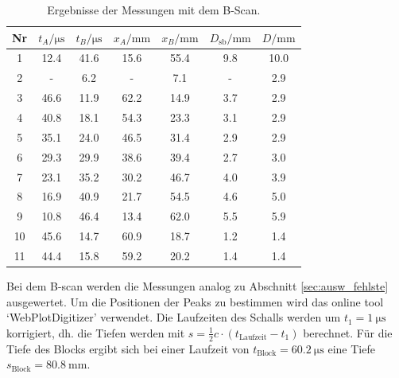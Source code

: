 \begin{table}[h]
    \centering
    \begin{tabular}{S[table-format=:.0] S S S S S S}
        \toprule
        {Nr}& {$t_A/\unit{\micro\second}$} & {$t_B/\unit{\micro\second}$} &
        {$x_A/\unit{\mm}$} & {$x_B/\unit{\mm}$} & {$D_\text{sb}/\unit{\mm}$}& {$D/\unit{\mm}$}\\
               & 12.4  & 41.6  & 15.6  & 55.4  & 9.8  & 10.0 \\
        2       & {-}   & 6.2   & {-}   & 7.1   & {-}  & 2.9  \\
        3       & 46.6  & 11.9  & 62.2  & 14.9  & 3.7  & 2.9  \\
        4       & 40.8  & 18.1  & 54.3  & 23.3  & 3.1  & 2.9  \\
        5       & 35.1  & 24.0  & 46.5  & 31.4  & 2.9  & 2.9  \\
        6       & 29.3  & 29.9  & 38.6  & 39.4  & 2.7  & 3.0  \\
        7       & 23.1  & 35.2  & 30.2  & 46.7  & 4.0  & 3.9  \\
        8       & 16.9  & 40.9  & 21.7  & 54.5  & 4.6  & 5.0  \\
        9       & 10.8  & 46.4  & 13.4  & 62.0  & 5.5  & 5.9  \\
        10      & 45.6  & 14.7  & 60.9  & 18.7  & 1.2  & 1.4  \\
        11      & 44.4  & 15.8  & 59.2  & 20.2  & 1.4  & 1.4  \\
        \bottomrule
    \end{tabular}
    \caption{Ergebnisse der Messungen mit dem B-Scan.}
    \label{tab:b-scan}
\end{table}

Bei dem B-scan werden die Messungen analog zu Abschnitt \ref{sec:ausw_fehlste} ausgewertet.
Um die Positionen der Peaks zu bestimmen wird das online tool \enquote*{WebPlotDigitizer} \cite{webplot} verwendet.
Die Laufzeiten des Schalls werden um $t_1 = \qty{1}{\micro\s}$ korrigiert, dh. die Tiefen werden mit
$s = \frac{1}{2} c \cdot (t_\text{Laufzeit} - t_1)$
berechnet.
Für die Tiefe des Blocks ergibt sich bei einer Laufzeit von $t_\text{Block}= \qty{60.2}{\micro\s}$ eine Tiefe 
$s_\text{Block}= \qty{80.8}{\mm}$.
   
